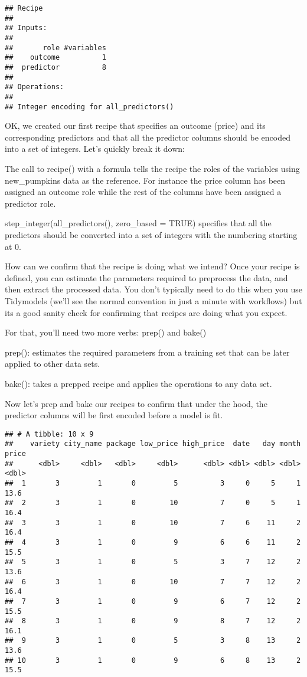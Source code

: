 \documentclass[
]{article}
\begin{document}
\begin{verbatim}
## Recipe
## 
## Inputs:
## 
##       role #variables
##    outcome          1
##  predictor          8
## 
## Operations:
## 
## Integer encoding for all_predictors()
\end{verbatim}

OK, we created our first recipe that specifies an outcome (price) and
its corresponding predictors and that all the predictor columns should
be encoded into a set of integers. Let's quickly break it down:

The call to recipe() with a formula tells the recipe the roles of the
variables using new\_pumpkins data as the reference. For instance the
price column has been assigned an outcome role while the rest of the
columns have been assigned a predictor role.

step\_integer(all\_predictors(), zero\_based = TRUE) specifies that all
the predictors should be converted into a set of integers with the
numbering starting at 0.

How can we confirm that the recipe is doing what we intend? Once your
recipe is defined, you can estimate the parameters required to
preprocess the data, and then extract the processed data. You don't
typically need to do this when you use Tidymodels (we'll see the normal
convention in just a minute with workflows) but its a good sanity check
for confirming that recipes are doing what you expect.

For that, you'll need two more verbs: prep() and bake()

prep(): estimates the required parameters from a training set that can
be later applied to other data sets.

bake(): takes a prepped recipe and applies the operations to any data
set.

Now let's prep and bake our recipes to confirm that under the hood, the
predictor columns will be first encoded before a model is fit.

\begin{verbatim}
## # A tibble: 10 x 9
##    variety city_name package low_price high_price  date   day month price
##      <dbl>     <dbl>   <dbl>     <dbl>      <dbl> <dbl> <dbl> <dbl> <dbl>
##  1       3         1       0         5          3     0     5     1  13.6
##  2       3         1       0        10          7     0     5     1  16.4
##  3       3         1       0        10          7     6    11     2  16.4
##  4       3         1       0         9          6     6    11     2  15.5
##  5       3         1       0         5          3     7    12     2  13.6
##  6       3         1       0        10          7     7    12     2  16.4
##  7       3         1       0         9          6     7    12     2  15.5
##  8       3         1       0         9          8     7    12     2  16.1
##  9       3         1       0         5          3     8    13     2  13.6
## 10       3         1       0         9          6     8    13     2  15.5
\end{verbatim}
\end{document}
